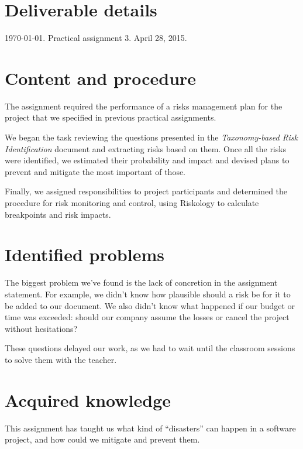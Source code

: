 \section{Deliverable details}

\noindent
{} \today.
 Practical assignment 3.
 April 28, 2015.

\section{Content and procedure}

The assignment required the performance of a risks management plan for the project that we specified in previous practical assignments.

We began the task reviewing the questions presented in the \textit{Taxonomy-based Risk Identification} document and extracting risks based on them. Once all the risks were identified, we estimated their probability and impact and devised plans to prevent and mitigate the most important of those.


Finally, we assigned responsibilities to project participants and determined the procedure for risk monitoring and control, using Riskology to calculate breakpoints and risk impacts.

\section{Identified problems}

The biggest problem we've found is the lack of concretion in the assignment statement. For example, we didn't know how plausible should a risk be for it to be added to our document. We also didn't know what happened if our budget or time was exceeded: should our company assume the losses or cancel the project without hesitations?

These questions delayed our work, as we had to wait until the classroom sessions to solve them with the teacher.

\section{Acquired knowledge}

This assignment has taught us what kind of ``disasters'' can happen in a software project, and how could we mitigate and prevent them.

